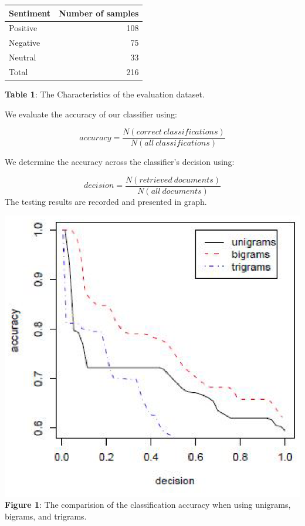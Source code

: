 \documentclass[a4paper,12pt]{article}
\begin{document}
\begin{center}
\begin{tabular}{|l|r|}
\hline
Sentiment & Number of samples\\
\hline
\hline
Positive & 108\\
Negative & 75\\
Neutral & 33\\
Total & 216\\
\hline
\end{tabular}
\linebreak
\linebreak 
\textbf{Table 1}: The Characteristics of the evaluation dataset.
\end{center}

\begin{flushleft}
We evaluate the accuracy \cite{manning1999foundations} of our classifier using:
\end{flushleft}

\begin{equation}
accuracy = \frac{N(correct\:classifications)}{N(all\:classifications)}
\end{equation}

\begin{flushleft}
 We determine the accuracy across the classifier’s decision \cite{adda1998grace} using:
\end{flushleft} 

\begin{equation}
decision = \frac{N(retrieved\:documents)}{N(all\:documents)}
\end{equation}
\linebreak
\linebreak
The testing results are recorded and presented in graph.

\begin{center}
\includegraphics[scale=0.5]{graph.eps}
\linebreak
\linebreak
\textbf{Figure 1}: The comparision of the classification accuracy when using unigrams, bigrams, and trigrams.
\end{center}
\end{document}
